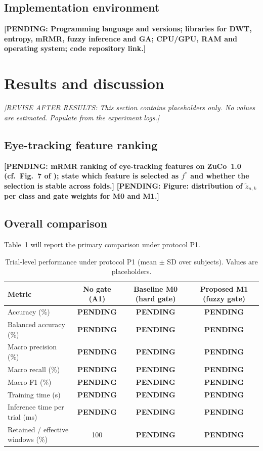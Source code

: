 \documentclass[11pt,a4paper]{article}
\newcommand{\pending}[1]{\textcolor{red!75!black}{\textbf{[PENDING: #1]}}}
\newcommand{\revise}[1]{\textcolor{orange!80!black}{\textit{[REVISE AFTER RESULTS: #1]}}}
\newcommand{\PND}{\textcolor{red!75!black}{\textbf{PENDING}}}
\newcommand{\dataset}{ZuCo~1.0}
\begin{document}
\subsection{Implementation environment}
\pending{Programming language and versions; libraries for DWT, entropy, mRMR, fuzzy inference and GA; CPU/GPU, RAM and operating system; code repository link.}

\section{Results and discussion}
\label{sec:results}

\revise{This section contains placeholders only. No values are estimated. Populate from the experiment logs.}

\subsection{Eye-tracking feature ranking}
\pending{mRMR ranking of eye-tracking features on \dataset{} (cf.\ Fig.~7 of \cite{FarhadiSedehi2024a}); state which feature is selected as $f^\ast$ and whether the selection is stable across folds.} \pending{Figure: distribution of $\tilde z_{n,k}$ per class and gate weights for M0 and M1.}

\subsection{Overall comparison}
Table~\ref{tab:main} will report the primary comparison under protocol P1.

\begin{table}[t]
\centering\small
\caption{Trial-level performance under protocol P1 (mean $\pm$ SD over subjects). Values are placeholders.}\label{tab:main}
\begin{tabular}{@{}lccc@{}}
\toprule
Metric & No gate (A1) & Baseline M0 (hard gate) & Proposed M1 (fuzzy gate)\\
\midrule
Accuracy (\%) & \PND & \PND & \PND\\
Balanced accuracy (\%) & \PND & \PND & \PND\\
Macro precision (\%) & \PND & \PND & \PND\\
Macro recall (\%) & \PND & \PND & \PND\\
Macro F1 (\%) & \PND & \PND & \PND\\
Training time (s) & \PND & \PND & \PND\\
Inference time per trial (ms) & \PND & \PND & \PND\\
Retained / effective windows (\%) & 100 & \PND & \PND\\
\bottomrule
\end{tabular}
\end{table}
\end{document}
